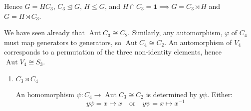 \documentclass[a4paper, oneside, 12pt, draft]{article}
\theoremstyle{definition}
\DeclareMathOperator{\Aut}{Aut}
\begin{document}
Hence \(G = H C_3\), \(C_3 \unlhd G\), \(H \leqslant G\), and \(H \cap C_3 =
\bm{1} \implies G = C_3 \rtimes H\) and \(G = H \rtimes C_3\).

We have seen already that \(\Aut{C_3} \cong C_2\).
Similarly, any automorphism, \(\varphi\) of \(C_4\) must map generators to
generators, so \(\Aut{C_4} \cong C_2\).
An automorphism of \(V_4\) corresponds to a permutation of the three
non-identity elements, hence \(\Aut{V_4} \cong S_3\).

\begin{enumerate}
    \item \(C_3 \rtimes C_4\)

        An homomorphism \(\psi:C_4 \to \Aut{C_3} \cong C_2\) is determined by
        \(y\psi\). Either:
        \[y\psi = x \mapsto x \quad \text{or} \quad y\psi = x \mapsto x^{-1}\]
\end{enumerate}
\end{document}
